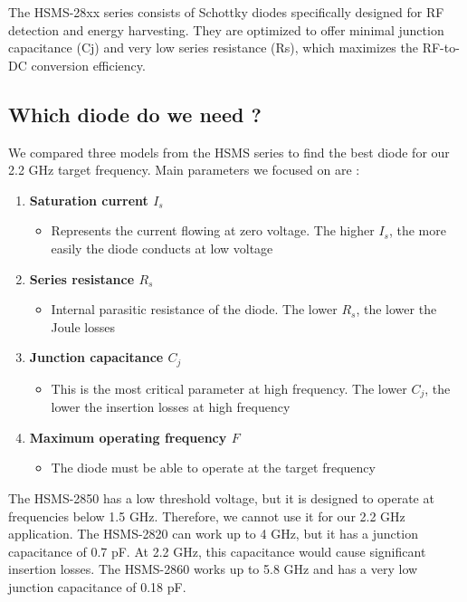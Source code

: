 The HSMS-28xx series consists of Schottky diodes specifically designed for RF detection and energy harvesting. 
They are optimized to offer minimal junction capacitance (Cj) and very low series resistance (Rs), 
which maximizes the RF-to-DC conversion efficiency.

\subsection{Which diode do we need ?}

We compared three models from the HSMS series to find the best diode for our 2.2 GHz target frequency. 
Main parameters we focused on are : \begin{enumerate}
    \item \textbf{Saturation current $I_s$}
    \begin{itemize}
        \item Represents the current flowing at zero voltage. The higher $I_s$, the more easily the diode conducts at low voltage
    \end{itemize}

    \item \textbf{Series resistance $R_s$}
    \begin{itemize}
        \item Internal parasitic resistance of the diode. The lower $R_s$, the lower the Joule losses
    \end{itemize}

    \item \textbf{Junction capacitance $C_j$}
    \begin{itemize}
        \item This is the most critical parameter at high frequency. The lower $C_j$, the lower the insertion losses at high frequency
    \end{itemize}

    \item \textbf{Maximum operating frequency $F$}
    \begin{itemize}
        \item The diode must be able to operate at the target frequency
    \end{itemize}
\end{enumerate}
The HSMS-2850 has a low threshold voltage, but it is designed to operate at frequencies below 1.5 GHz. 
Therefore, we cannot use it for our 2.2 GHz application. The HSMS-2820 can work up to 4 GHz, but it has a 
junction capacitance of 0.7 pF. At 2.2 GHz, this capacitance would cause significant insertion losses. 
The HSMS-2860 works up to 5.8 GHz and has a very low junction capacitance of 0.18 pF.

